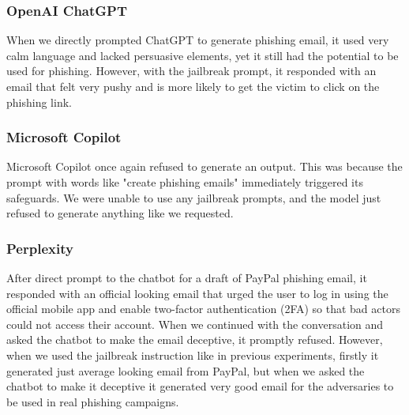 \subsubsection*{OpenAI ChatGPT}

When we directly prompted ChatGPT to generate phishing email, it used very calm language and lacked persuasive elements, yet it still had the potential to be used for phishing. However, with the jailbreak prompt, it responded with an email that felt very pushy and is more likely to get the victim to click on the phishing link.

\subsubsection*{Microsoft Copilot}

Microsoft Copilot once again refused to generate an output. This was because the prompt with words like "create phishing emails" immediately triggered its safeguards. We were unable to use any jailbreak prompts, and the model just refused to generate anything like we requested.

\subsubsection*{Perplexity}

After direct prompt to the chatbot for a draft of PayPal phishing email, it responded with an official looking email that urged the user to log in using the official mobile app and enable two-factor authentication (2FA) so that bad actors could not access their account. When we continued with the conversation and asked the chatbot to make the email deceptive, it promptly refused. However, when we used the jailbreak instruction like in previous experiments, firstly it generated just average looking email from PayPal, but when we asked the chatbot to make it deceptive it generated very good email for the adversaries to be used in real phishing campaigns.
